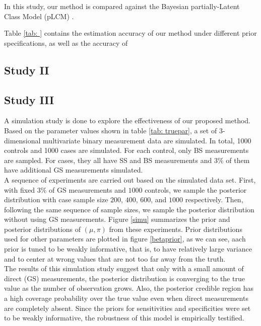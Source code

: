 \documentclass[11 pt, a4paper]{article}  %
\begin{document}
In this study, our method is compared against the Bayesian partially-Latent Class Model (pLCM) \cite{wu2015partially}. 

Table \ref{tab: } contains the estimation accuracy of our method under different prior specifications, as well as the accuracy of 

\subsection{Study II}

\subsection{Study III}
A simulation study is done to explore the effectiveness of our proposed method. Based on the parameter values shown in table \ref{tab: truepar}, a set of 3-dimensional multivariate binary measurement data are simulated. In total, 1000 controls and 1000 cases are simulated.  For each control, only BS measurements are sampled. For cases, they all have SS and BS measurements and $3\%$ of them have additional GS measurements simulated. \\

A sequence of experiments are carried out based on the simulated data set. First, with fixed $3\%$ of GS measurements and $1000$ controls, we sample the posterior distribution with case sample size $200$, $400$, $600$, and $1000$ respectively. Then, following the same sequence of sample sizes, we sample the posterior distribution without using GS measurements. Figure \ref{simu} summarizes the prior and posterior distributions of $(\mu, \pi)$ from these experiments. Prior distributions used for other parameters are plotted in figure \ref{betaprior}, as we can see, aach prior is tuned to be weakly informative, that is, to have relatively large variance and to center at wrong values that are not too far away from the truth.\\

The results of this simulation study suggest that only with a small amount of direct (GS) measurements, the posterior distribution is converging to the true value as the number of observation grows. Also, the posterior credible region has a high coverage probability over the true value even when direct measurements are completely absent. Since the priors for sensitivities and specificities were set to be weakly informative, the robustness of this model is empirically testified.




\end{document}
